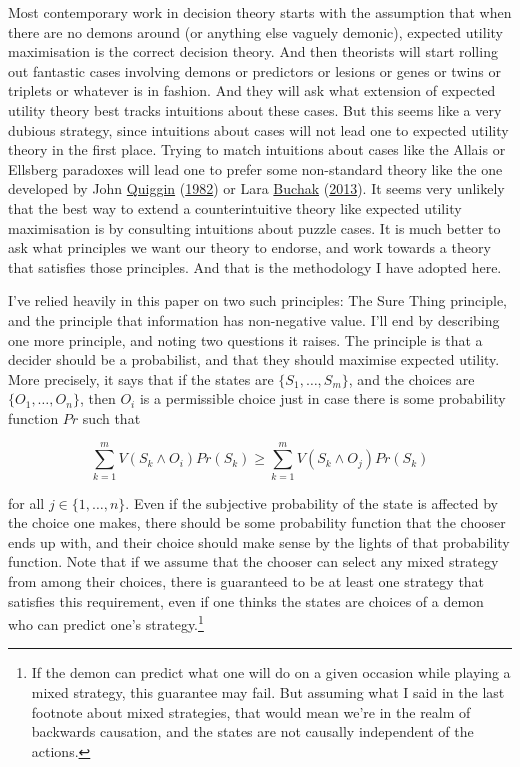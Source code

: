 \documentclass[
  12pt,
]{article}
\begin{document}
Most contemporary work in decision theory starts with the assumption
that when there are no demons around (or anything else vaguely demonic),
expected utility maximisation is the correct decision theory. And then
theorists will start rolling out fantastic cases involving demons or
predictors or lesions or genes or twins or triplets or whatever is in
fashion. And they will ask what extension of expected utility theory
best tracks intuitions about these cases. But this seems like a very
dubious strategy, since intuitions about cases will not lead one to
expected utility theory in the first place. Trying to match intuitions
about cases like the Allais or Ellsberg paradoxes will lead one to
prefer some non-standard theory like the one developed by John
\protect\hyperlink{ref-Quiggin1982}{Quiggin}
(\protect\hyperlink{ref-Quiggin1982}{1982}) or Lara
\protect\hyperlink{ref-BuchakRisk}{Buchak}
(\protect\hyperlink{ref-BuchakRisk}{2013}). It seems very unlikely that
the best way to extend a counterintuitive theory like expected utility
maximisation is by consulting intuitions about puzzle cases. It is much
better to ask what principles we want our theory to endorse, and work
towards a theory that satisfies those principles. And that is the
methodology I have adopted here.

I've relied heavily in this paper on two such principles: The Sure Thing
principle, and the principle that information has non-negative value.
I'll end by describing one more principle, and noting two questions it
raises. The principle is that a decider should be a probabilist, and
that they should maximise expected utility. More precisely, it says that
if the states are \(\{S_1, \dots, S_m\}\), and the choices are
\(\{O_1, \dots, O_n\}\), then \(O_i\) is a permissible choice just in
case there is some probability function \(Pr\) such that

\[
\sum_{k = 1}^m V(S_k \wedge O_i)Pr(S_k) \geq \sum_{k = 1}^m V(S_k \wedge O_j)Pr(S_k)
\]

for all \(j \in \{1, \dots, n\}\). Even if the subjective probability of
the state is affected by the choice one makes, there should be some
probability function that the chooser ends up with, and their choice
should make sense by the lights of that probability function. Note that
if we assume that the chooser can select any mixed strategy from among
their choices, there is guaranteed to be at least one strategy that
satisfies this requirement, even if one thinks the states are choices of
a demon who can predict one's strategy.\footnote{If the demon can
  predict what one will do on a given occasion while playing a mixed
  strategy, this guarantee may fail. But assuming what I said in the
  last footnote about mixed strategies, that would mean we're in the
  realm of backwards causation, and the states are not causally
  independent of the actions.}
\end{document}

